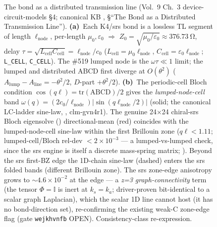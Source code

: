 \begin{figure}[htbp]
\begin{tikzpicture}[scale=1.0]
\end{tikzpicture}
\caption{The bond as a distributed transmission line (Vol.~9 Ch.~3 device-circuit-models \S4; canonical KB , \S``The Bond as a Distributed Transmission Line''). \textbf{(a)}~Each K4/srs bond is a lossless TL segment of length $\ell_{\mathrm{node}}$, per-length $\mu_0,\varepsilon_0$ $\Rightarrow$ $Z_0=\sqrt{\mu_0/\varepsilon_0}\approx\SI{376.73}{\ohm}$, delay $\tau=\sqrt{L_{\mathrm{cell}}C_{\mathrm{cell}}}=\ell_{\mathrm{node}}/c_0$ ($L_{\mathrm{cell}}=\mu_0\ell_{\mathrm{node}}$, $C_{\mathrm{cell}}=\varepsilon_0\ell_{\mathrm{node}}$;  \texttt{L\_CELL}, \texttt{C\_CELL}). The \#519 lumped node is the $\omega\tau\ll1$ limit; the lumped and distributed ABCD first diverge at $O(\theta^2)$ ($A_{\mathrm{lump}}-A_{\mathrm{line}}=-\theta^2/2$, $D$-part $+\theta^2/2$). \textbf{(b)}~The periodic-cell Bloch condition $\cos(q\ell)=\mathrm{tr(ABCD)}/2$ gives the \emph{lumped-node-cell} band $\omega(q)=(2c_0/\ell_{\mathrm{node}})|\sin(q\ell_{\mathrm{node}}/2)|$ (solid; the canonical LC-ladder sine-law, , clm-gvn4r1). The genuine 24$\times$24 chiral-srs Bloch eigensolve () directional-mean (red) coincides with the lumped-node-cell sine-law within the first Brillouin zone ($q\ell<1.11$; lumped-cell/Bloch rel-dev $<2\times10^{-3}$ --- a lumped-vs-lumped check, since the srs engine is itself a discrete mass-spring matrix; ). Beyond the srs first-BZ edge the 1D-chain sine-law (dashed) enters the srs folded bands (different Brillouin zone). The srs zone-edge anisotropy grows to $\sim4.6\times10^{-2}$ at the edge --- a \emph{z=3 graph-connectivity} term (the tensor $\Phi=\mathbb{I}$ is inert at $k_s=k_a$; driver-proven bit-identical to a scalar graph Laplacian), which the scalar 1D line cannot host (it has no bond-direction set), re-confirming the existing weak-C zone-edge flag (gate \texttt{wejkhvnfb} OPEN). Consistency-class re-expression.}
\label{fig:vol9_circuit_bond_transmission_line}
\end{figure}
